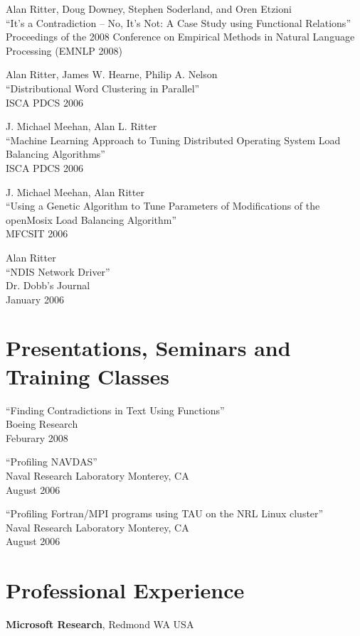 \documentclass[margin,line]{res}
\begin{document}
\begin{resume}
Alan Ritter, Doug Downey, Stephen Soderland, and Oren Etzioni \\
``It's a Contradiction -- No, It's Not: A Case Study using Functional Relations'' \\
Proceedings of the 2008 Conference on Empirical Methods in Natural Language Processing (EMNLP 2008)

Alan Ritter, James W. Hearne, Philip A. Nelson \\
``Distributional Word Clustering in Parallel'' \\
ISCA PDCS 2006

J. Michael Meehan, Alan L. Ritter \\
``Machine Learning Approach to Tuning Distributed Operating System Load Balancing Algorithms'' \\
ISCA PDCS 2006

J. Michael Meehan, Alan Ritter \\
``Using a Genetic Algorithm to Tune Parameters of Modifications of the openMosix Load Balancing Algorithm'' \\
MFCSIT 2006

Alan Ritter \\
``NDIS Network Driver'' \\
Dr. Dobb's Journal \\
January 2006

\section{\sc Presentations, Seminars and Training Classes}
``Finding Contradictions in Text Using Functions'' \\
Boeing Research \\
Feburary 2008

``Profiling NAVDAS'' \\
Naval Research Laboratory Monterey, CA \\
August 2006

``Profiling Fortran/MPI programs using TAU on the NRL Linux cluster'' \\
Naval Research Laboratory Monterey, CA \\
August 2006

\section{\sc Professional Experience}
\vspace{-.3cm}
{\bf Microsoft Research},
Redmond WA USA


\end{resume}
\end{document}

